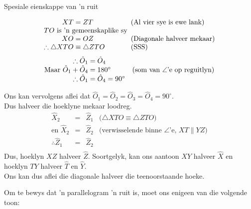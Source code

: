 \begin{wex}{Spesiale eienskappe van 'n ruit}
{
\begin{equation*}
 \begin{array}{r@{\;}l@{\quad}l}
XT &= ZT & \mbox{(Al vier sye is ewe lank)} \\
 \multicolumn{2}{c}{TO\mbox{ is 'n gemeenskaplike sy}} & \\ 
XO &= OZ & \mbox{(Diagonale halveer mekaar)} \\ 
\therefore \triangle XTO &\equiv \triangle ZTO & \mbox{(SSS)} \\
 \end{array}
\end{equation*}
\begin{equation*}
 \begin{array}{r@{\;}l@{\quad}l}
\therefore \hat{O}_1 &= \hat{O}_4 & \\

\mbox{Maar }\hat{O}_1 + \hat{O}_4 &= 180^\circ & \mbox{(som van $\angle$'e op reguitlyn)} \\
\therefore \hat{O}_1 &= \hat{O}_4 = 90^\circ & 
 \end{array}

\end{equation*}


Ons kan vervolgens aflei dat $\hat{O}_1 = \hat{O}_2 = \hat{O}_3 = \hat{O}_4 = 90^\circ$. \\
Dus halveer die hoeklyne mekaar loodreg.
\begin{equation*}
 \begin{array}{rcll}
 \hat{X}_2 &=& \hat{Z}_1 & \mbox{($\triangle XTO \equiv \triangle ZTO$)} \\
\mbox{en }\hat{X}_2 &=& \hat{Z}_2 & \mbox{(verwisselende binne $\angle$'e, $XT \parallel YZ$)} \\
\therefore \hat{Z}_1 &=& \hat{Z}_2 & \\
 \end{array}

\end{equation*}
Dus, hoeklyn $XZ$ halveer $\hat{Z}$. 
Soortgelyk, kan ons aantoon $XY$ halveer $\hat{X}$
en hoeklyn $TY$ halveer $\hat{T}$ en $\hat{Y}$. \\ 
Ons kan dus aflei die diagonale halveer die teenoorstaande hoeke.
}
\end{wex}
\vspace*{-20pt}
Om te bewys dat 'n parallelogram 'n ruit is, moet ons enigeen van die volgende toon:
